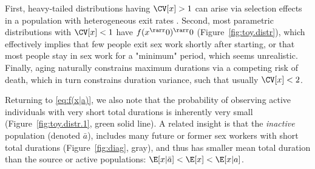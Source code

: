 First, heavy-tailed distributions having $\CV[x] > 1$ can arise via selection effects
in a population with heterogeneous exit rates \cite{Balan2020}.
Second, most parametric distributions with $\CV[x] < 1$
have $f(x\sp\rarr0)\sp\rarr0$ (Figure~\ref{fig:toy.distr}), which effectively implies
that few people exit sex work shortly after starting, or
that most people stay in sex work for a "minimum" period,
which seems unrealistic.
Finally, aging naturally constrains maximum durations via a competing risk of death,
which in turn constrains duration variance,
such that usually $\CV[x] < 2$.
\par
Returning to \eqref{eq:f(x|a)},
we also note that the probability of observing
active individuals with very short total durations is inherently very small
(Figure~\ref{fig:toy.distr.1}, green solid line).
A related insight is that the \emph{inactive} population (denoted $\bar{a}$),
includes many future or former sex workers with short total durations
(Figure~\ref{fig:diag}, gray),
and thus has smaller mean total duration than the source or active populations:
$\E[x|\bar{a}] < \E[x] < \E[x|a]$.
